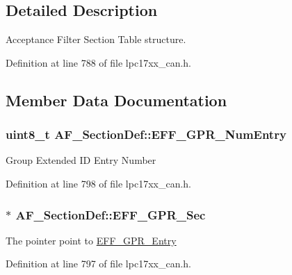 \subsection{\-Detailed \-Description}
\-Acceptance \-Filter \-Section \-Table structure. 

\-Definition at line 788 of file lpc17xx\-\_\-can.\-h.



\subsection{\-Member \-Data \-Documentation}
\hypertarget{struct_a_f___section_def_a1bf2008b2a34adc112f446f2dd450c76}{
\subsubsection[{\-E\-F\-F\-\_\-\-G\-P\-R\-\_\-\-Num\-Entry}]{\setlength{\rightskip}{0pt plus 5cm}uint8\-\_\-t {\bf \-A\-F\-\_\-\-Section\-Def\-::\-E\-F\-F\-\_\-\-G\-P\-R\-\_\-\-Num\-Entry}}}\label{struct_a_f___section_def_a1bf2008b2a34adc112f446f2dd450c76}
\-Group \-Extended \-I\-D \-Entry \-Number 

\-Definition at line 798 of file lpc17xx\-\_\-can.\-h.

\hypertarget{struct_a_f___section_def_adc6b791fa347e7c1eb36e91df51e5181}{
\subsubsection[{\-E\-F\-F\-\_\-\-G\-P\-R\-\_\-\-Sec}]{$\ast$ {\bf \-A\-F\-\_\-\-Section\-Def\-::\-E\-F\-F\-\_\-\-G\-P\-R\-\_\-\-Sec}}}\label{struct_a_f___section_def_adc6b791fa347e7c1eb36e91df51e5181}
\-The pointer point to \hyperlink{struct_e_f_f___g_p_r___entry}{\-E\-F\-F\-\_\-\-G\-P\-R\-\_\-\-Entry} 

\-Definition at line 797 of file lpc17xx\-\_\-can.\-h.

